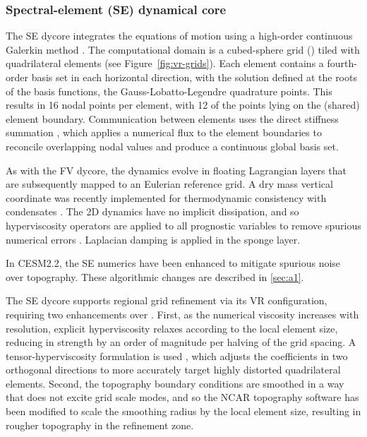 \documentclass[draft]{agujournal2019}
\begin{document}
\subsubsection{Spectral-element (SE) dynamical core}

The SE dycore integrates the {\color{blue}{hydrostatic}} equations of motion using a high-order continuous Galerkin method \cite{TTI1997JCP,TF2010JCP}. The computational domain is a cubed-sphere grid ({\color{blue}{obtained by projecting each face of a cube onto a sphere}}) tiled with quadrilateral elements (see Figure~\ref{fig:vr-grids}). Each element contains a fourth-order basis set in each horizontal direction, with the solution defined at the roots of the basis functions, the Gauss-Lobatto-Legendre quadrature points. This results in 16 nodal points per element, with 12 of the points lying on the (shared) element boundary. Communication between elements uses the direct stiffness summation \cite{canuto2007}, which applies a numerical flux to the element boundaries to reconcile overlapping nodal values and produce a continuous global basis set. 

As with the FV dycore, the dynamics evolve in floating Lagrangian layers that are subsequently mapped to an Eulerian reference grid. A dry mass vertical coordinate was recently implemented for thermodynamic consistency with condensates \cite{LetAl2018JAMES}. The 2D dynamics have no implicit dissipation, and so hyperviscosity operators are applied to all prognostic variables to remove spurious numerical errors \cite{DetAl2012IJHPCA}. Laplacian damping is applied in the sponge layer.

{\color{blue}{SE is a next-generation dycore, and is less mature than the FV dycore due to its shorter history.}} In CESM2.2, the SE numerics have been enhanced {\color{blue}{relative to CESM2.0}} to mitigate spurious noise over topography. These algorithmic changes are described in \ref{sec:a1}. {\color{blue}{Future versions of CESM will likely include further optimizations and enhancements to the (nascent) SE dycore.}} 

The SE dycore supports regional grid refinement via its VR configuration, requiring two enhancements over {\color{blue}{quasi-uniform resolution grids}}. First, as the numerical viscosity increases with resolution, explicit hyperviscosity relaxes according to the local element size, reducing in strength  by an order of magnitude per halving of the grid spacing. A tensor-hyperviscosity formulation is used \cite{GetAl2014GMD}, which adjusts the coefficients in two orthogonal directions to more accurately target highly distorted quadrilateral elements. Second, the topography boundary conditions are smoothed in a way that does not excite grid scale modes, and so the NCAR topography software \cite{LetAl2015GMD} has been modified to scale the smoothing radius by the local element size, resulting in rougher topography in the refinement zone. 
\end{document}

